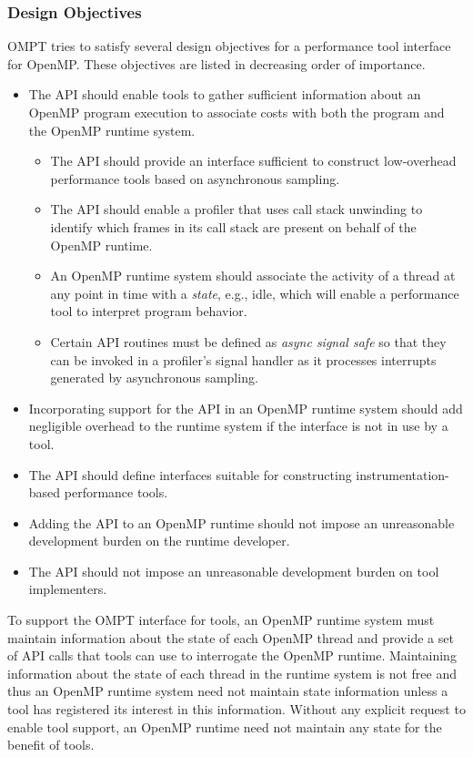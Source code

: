 \documentclass{article}
\begin{document}
\subsubsection{Design Objectives}
OMPT tries to satisfy several design objectives for a performance tool interface for OpenMP. These objectives are listed in decreasing order of importance.
\begin{itemize}
\item The  API should enable tools to gather sufficient information about an OpenMP program execution  to associate costs with both the program and the OpenMP runtime system.
\begin{itemize}
\item The  API should provide an interface sufficient to construct low-overhead performance tools based on asynchronous sampling.
\item The API should enable a profiler that uses call stack unwinding to identify which frames in its call stack are present on behalf of the OpenMP runtime.
\item An OpenMP runtime system should associate the activity of a thread at any point in time with a {\em state}, e.g., idle, which will enable a performance tool to interpret program behavior.  
\item Certain API routines must be defined as {\em async signal safe} so that they can be invoked in a profiler's signal handler as it processes interrupts generated by asynchronous sampling.
\end{itemize}
\item Incorporating support for the  API in an OpenMP runtime system should add negligible overhead to the runtime system if the interface is not in use by a tool.
\item The API should define interfaces suitable for constructing  instrumentation-based performance tools.
\item Adding the API to an OpenMP runtime should not impose an unreasonable development burden on the runtime developer.
\item The API should not impose an unreasonable development burden on tool implementers.
\end{itemize}

To support the OMPT interface for tools, an OpenMP runtime system must maintain information about the state of each OpenMP thread and provide a set of API calls that tools can use to interrogate the OpenMP runtime. Maintaining information about the state of each thread in the runtime system is not free and thus an OpenMP runtime system need not maintain state information unless a tool has registered its interest in this information.
Without any explicit request to enable tool support, an OpenMP runtime need not maintain any state for the benefit of tools.
\end{document}
